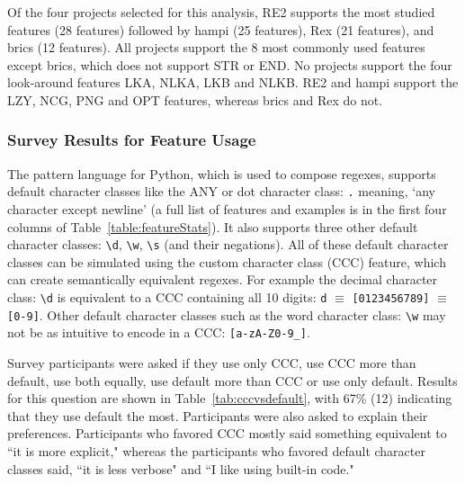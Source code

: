 Of the four projects selected for this analysis, RE2 supports the most studied features (28 features) followed by hampi (25 features),  Rex (21 features), and brics (12 features).  All projects support the 8 most commonly used features except brics, which does not support STR or END.  
No projects support the four look-around features LKA, NLKA, LKB and NLKB.  RE2 and hampi support the LZY, NCG, PNG and OPT features, whereas brics and Rex do not.%


\subsubsection{Survey Results for Feature Usage}
The pattern language for Python, which is used to compose regexes, supports default character classes like the ANY or dot character class: \verb!.! meaning, `any character except newline' (a full list of features and examples is in the first four columns of Table~\ref{table:featureStats}).  
It also supports three other default character classes: \verb!\d!, \verb!\w!, \verb!\s! (and their negations). All of these default character classes can be simulated using the custom character class (CCC) feature, which can create semantically equivalent regexes.  
For example  the decimal character class: \verb!\d! is equivalent to a CCC containing all 10 digits:  \verb!d! $\equiv$ \verb![0123456789]! $\equiv$ \verb![0-9]!.  
Other default character classes such as the word character class: \verb!\w! may not be as intuitive to encode in a CCC: \verb![a-zA-Z0-9_]!.  

Survey participants were asked if they use only CCC, use CCC more than default, use both equally, use default more than CCC or use only default.  Results for this question are shown in Table~\ref{tab:cccvsdefault}, with 67\% (12) indicating that they use default the most. 
Participants were also asked to explain their preferences.  Participants who favored CCC mostly said something equivalent to ``it is more explicit," whereas the participants who favored default character classes said,  ``it is less verbose" and ``I like using built-in code."


